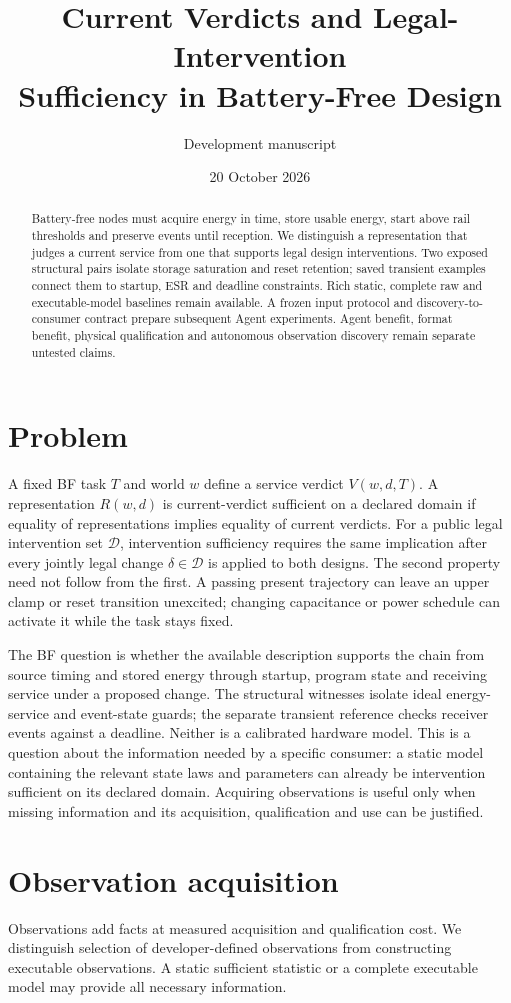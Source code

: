 \documentclass[10pt]{article}
\title{Current Verdicts and Legal-Intervention\\Sufficiency in Battery-Free Design}
\author{Development manuscript}
\date{20 October 2026}
\begin{document}
\maketitle
\begin{abstract}
Battery-free nodes must acquire energy in time, store usable energy, start above rail thresholds and preserve events until reception. We distinguish a representation that judges a current service from one that supports legal design interventions. Two exposed structural pairs isolate storage saturation and reset retention; saved transient examples connect them to startup, ESR and deadline constraints. Rich static, complete raw and executable-model baselines remain available. A frozen input protocol and discovery-to-consumer contract prepare subsequent Agent experiments. Agent benefit, format benefit, physical qualification and autonomous observation discovery remain separate untested claims.
\end{abstract}
\section{Problem}
A fixed BF task $T$ and world $w$ define a service verdict $V(w,d,T)$. A representation $R(w,d)$ is current-verdict sufficient on a declared domain if equality of representations implies equality of current verdicts. For a public legal intervention set $\mathcal D$, intervention sufficiency requires the same implication after every jointly legal change $\delta\in\mathcal D$ is applied to both designs. The second property need not follow from the first. A passing present trajectory can leave an upper clamp or reset transition unexcited; changing capacitance or power schedule can activate it while the task stays fixed.

The BF question is whether the available description supports the chain from source timing and stored energy through startup, program state and receiving service under a proposed change. The structural witnesses isolate ideal energy-service and event-state guards; the separate transient reference checks receiver events against a deadline. Neither is a calibrated hardware model. This is a question about the information needed by a specific consumer: a static model containing the relevant state laws and parameters can already be intervention sufficient on its declared domain. Acquiring observations is useful only when missing information and its acquisition, qualification and use can be justified.

\section{Observation acquisition}
Observations add facts at measured acquisition and qualification cost. We distinguish selection of developer-defined observations from constructing executable observations. A static sufficient statistic or a complete executable model may provide all necessary information.
\end{document}

